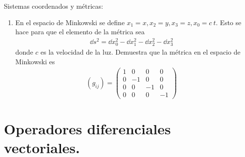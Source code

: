 \begin{ejer}{Sistemas coordenados y métricas:}
\begin{enumerate}
\begin{enumerate}[label=(\alph*)]
\end{enumerate}
\item En el espacio de Minkowski se define $x_{1} = x, x_{2} = y, x_{3} = z, x_{0} = c \: t$. Esto se hace para que el elemento de la métrica sea 
\begin{align*}
\dd{s^{2}} = \dd{x_{0}^{2}} - \dd{x_{1}^{2}} - \dd{x_{2}^{2}} - \dd{x_{3}^{2}}
\end{align*}
donde $c$ es la velocidad de la luz. Demuestra que la métrica en el espacio de Minkowski es
\begin{align*}
(g_{ij}) = \begin{pmatrix}
1 & 0 & 0 & 0 \\
0 & -1 & 0 & 0 \\
0 & 0 & -1 & 0 \\
0 & 0 & 0 & -1
\end{pmatrix}
\end{align*}
\end{enumerate}
\end{ejer}
\section{Operadores diferenciales vectoriales.}
